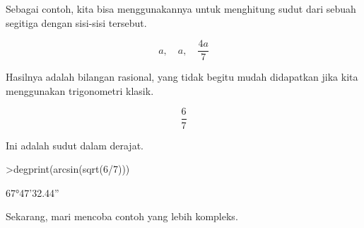 \documentclass[12pt,arial,letterpaper]{book}
\begin{document}
\begin{eulercomment}
\begin{eulercomment}
\begin{eulercomment}
\begin{eulercomment}
\begin{eulercomment}
\begin{eulercomment}
\begin{eulercomment}
\begin{eulercomment}
\begin{eulercomment}
\begin{eulercomment}
\begin{eulercomment}
\begin{eulercomment}
\begin{eulercomment}
\begin{eulercomment}
\begin{eulercomment}
\begin{eulercomment}
\begin{eulercomment}
\begin{eulercomment}
\begin{eulercomment}
\begin{eulercomment}
\begin{eulercomment}
\begin{eulercomment}
\begin{eulercomment}
\begin{eulercomment}
\begin{eulercomment}
\begin{eulercomment}
\begin{eulercomment}
\begin{eulercomment}
\begin{eulercomment}
Sebagai contoh, kita bisa menggunakannya untuk menghitung sudut dari
sebuah segitiga dengan sisi-sisi tersebut.

\end{eulercomment}
\begin{eulerformula}
\[
a, \quad a, \quad \frac{4a}{7}
\]
\end{eulerformula}
\begin{eulercomment}
Hasilnya adalah bilangan rasional, yang tidak begitu mudah didapatkan
jika kita menggunakan trigonometri klasik.
\end{eulercomment}
\begin{eulerformula}
\[
\frac{6}{7}
\]
\end{eulerformula}
\begin{eulercomment}
Ini adalah sudut dalam derajat.
\end{eulercomment}
\begin{eulerprompt}
>degprint(arcsin(sqrt(6/7)))
\end{eulerprompt}
\begin{euleroutput}
  67°47'32.44''
\end{euleroutput}
\begin{eulercomment}
Sekarang, mari mencoba contoh yang lebih kompleks.


\end{eulercomment}
\end{eulercomment}
\end{eulercomment}
\end{eulercomment}
\end{eulercomment}
\end{eulercomment}
\end{eulercomment}
\end{eulercomment}
\end{eulercomment}
\end{eulercomment}
\end{eulercomment}
\end{eulercomment}
\end{eulercomment}
\end{eulercomment}
\end{eulercomment}
\end{eulercomment}
\end{eulercomment}
\end{eulercomment}
\end{eulercomment}
\end{eulercomment}
\end{eulercomment}
\end{eulercomment}
\end{eulercomment}
\end{eulercomment}
\end{eulercomment}
\end{eulercomment}
\end{eulercomment}
\end{eulercomment}
\end{eulercomment}
\end{document}
